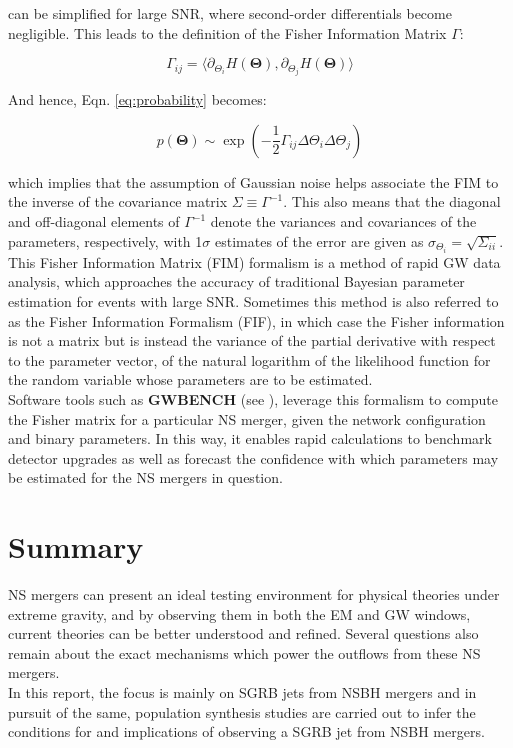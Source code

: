     can be simplified for large SNR, where second-order differentials become negligible.
    This leads to the definition of the Fisher Information Matrix $\Gamma$:

    \begin{equation}
        \Gamma_{ij} =
            \langle
                \partial_{\Theta_i} H(\mathbf{\Theta}),
                \partial_{\Theta_j} H(\mathbf{\Theta})
            \rangle
    \end{equation}

    And hence, Eqn. \ref{eq:probability} becomes:

    \begin{equation}
        p(\mathbf{\Theta}) \sim
            \exp\left(
                         -\dfrac{1}{2}
                          \Gamma_{ij}
                          \Delta\Theta_i
                          \Delta\Theta_j
                \right)
    \end{equation}

    which implies that the assumption of Gaussian noise helps associate the FIM to the
    inverse of the covariance matrix $\Sigma \equiv \Gamma^{-1}$. This also means that
    the diagonal and off-diagonal elements of $\Gamma^{-1}$ denote the variances and
    covariances of the parameters, respectively, with 1$\sigma$ estimates of the error
    are given as $\sigma_{\Theta_i} = \sqrt{\Sigma_{ii}}$.\\
    This Fisher Information Matrix (FIM) formalism is a method of rapid GW data
    analysis, which approaches the accuracy of traditional Bayesian parameter estimation
    for events with large SNR.  Sometimes this method is also referred to as the Fisher
    Information Formalism (FIF), in which case the Fisher information is not a matrix
    but is instead the variance of the partial derivative with respect to the parameter
    vector, of the natural logarithm of the likelihood function for the random variable
    whose parameters are to be estimated.\\
    Software tools such as \textbf{GWBENCH} (see \cite{borhanian_2020}), leverage this
    formalism to compute the Fisher matrix for a particular NS merger, given the network
    configuration and binary parameters. In this way, it enables rapid calculations to
    benchmark detector upgrades as well as forecast the confidence with which parameters
    may be estimated for the NS mergers in question.\\

\section{Summary}

    NS mergers can present an ideal testing environment for physical theories under
    extreme gravity, and by observing them in both the EM and GW windows, current
    theories can be better understood and refined. Several questions also remain about
    the exact mechanisms which power the outflows from these NS mergers.\\
    In this report, the focus is mainly on SGRB jets from NSBH mergers and in pursuit of
    the same, population synthesis studies are carried out to infer the conditions for
    and implications of observing a SGRB jet from NSBH mergers.
